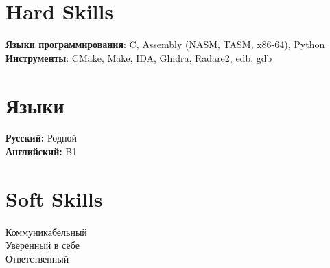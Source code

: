 \documentclass[A4,11pt]{article}
\begin{document}
\section{Hard Skills}
 \begin{itemize}[leftmargin=0.5cm, label={}]
    \small{\item{
     \textbf{Языки программирования}{: C, Assembly (NASM, TASM, x86-64), Python} \\
     \textbf{Инструменты}{: CMake, Make, IDA, Ghidra, Radare2, edb, gdb}
    }}
 \end{itemize}

\section{Языки}
 \begin{itemize}[leftmargin=0.5cm, label={}]
    \small{\item{
\textbf{Русский:} Родной \\
\textbf{Английский:} B1
    }}
 \end{itemize}

\section{Soft Skills}
 \begin{itemize}[leftmargin=0.5cm, label={}]
    \small{\item{
     {Коммуникабельный}\\
     {Уверенный в себе}\\
     {Ответственный}
    }}
 \end{itemize}

\end{document}
